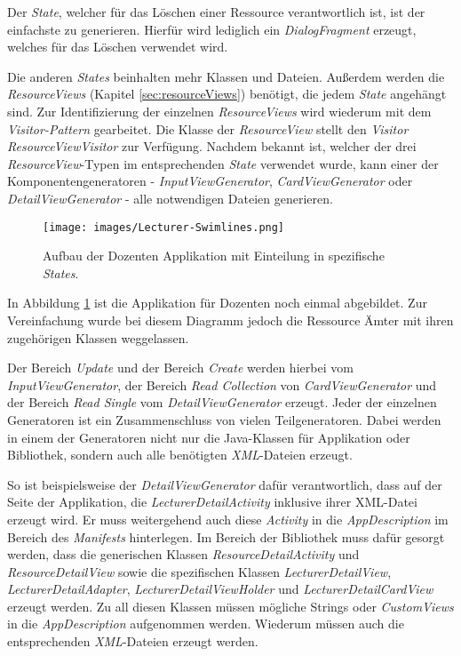 Der \textit{State}, welcher für das Löschen einer Ressource verantwortlich ist, ist der einfachste zu generieren. Hierfür wird lediglich ein \textit{DialogFragment} erzeugt, welches für das Löschen verwendet wird. 

Die anderen \textit{States} beinhalten mehr Klassen und Dateien. Außerdem werden die \textit{ResourceViews} (Kapitel \ref{sec:resourceViews}) benötigt, die jedem \textit{State} angehängt sind. Zur Identifizierung der einzelnen \textit{ResourceViews} wird wiederum mit dem \textit{Visitor-Pattern} gearbeitet. Die Klasse der \textit{ResourceView} stellt den \textit{Visitor} \textit{ResourceViewVisitor} zur Verfügung. 
Nachdem bekannt ist, welcher der drei \textit{ResourceView}-Typen im entsprechenden \textit{State} verwendet wurde, kann einer der Komponentengeneratoren - \textit{InputViewGenerator}, \textit{CardViewGenerator} oder \textit{DetailViewGenerator} - alle notwendigen Dateien generieren.

\begin{figure}[H]
	\begin{center}
		\texttt{[image: images/Lecturer-Swimlines.png]}
		\caption{Aufbau der Dozenten Applikation mit Einteilung in spezifische \textit{States}.}
		\label{fig:swimlines}
	\end{center}
\end{figure}

In Abbildung \ref{fig:swimlines} ist die Applikation für Dozenten noch einmal abgebildet. Zur Vereinfachung wurde bei diesem Diagramm jedoch die Ressource Ämter mit ihren zugehörigen Klassen weggelassen.

Der Bereich \textit{Update} und der Bereich \textit{Create} werden hierbei vom \textit{InputViewGenerator}, der Bereich \textit{Read Collection} von \textit{CardViewGenerator} und der Bereich \textit{Read Single} vom \textit{DetailViewGenerator} erzeugt.
Jeder der einzelnen Generatoren ist ein Zusammenschluss von vielen Teilgeneratoren. Dabei werden in einem der Generatoren nicht nur die Java-Klassen für Applikation oder Bibliothek, sondern auch alle benötigten \textit{XML}-Dateien erzeugt.

\newpage

So ist beispielsweise der \textit{DetailViewGenerator} dafür verantwortlich, dass auf der Seite der Applikation, die \textit{LecturerDetailActivity} inklusive ihrer XML-Datei erzeugt wird. Er muss weitergehend auch diese \textit{Activity} in die \textit{AppDescription} im Bereich des \textit{Manifests} hinterlegen. Im Bereich der Bibliothek muss dafür gesorgt werden, dass die generischen Klassen \textit{ResourceDetailActivity} und \textit{ResourceDetailView} sowie die spezifischen Klassen \textit{LecturerDetailView}, \textit{LecturerDetailAdapter}, \textit{LecturerDetailViewHolder} und \textit{LecturerDetailCardView} erzeugt werden. Zu all diesen Klassen müssen mögliche Strings oder \textit{CustomViews} in die \textit{AppDescription} aufgenommen werden. Wiederum müssen auch die entsprechenden \textit{XML}-Dateien erzeugt werden. 

